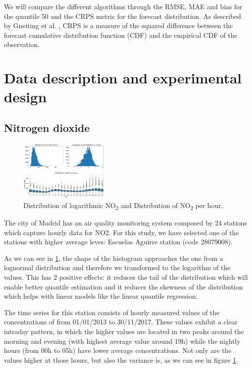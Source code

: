 \documentclass[a4paper,twocolumn,5p]{elsarticle}
\begin{document}
We will compare the different algorithms through the RMSE, MAE 
and bias for the quantile 50 and 
the CRPS metric for the forecast distribution.
As described by Gneiting et al. \cite{gneiting_probabilistic_2014},
CRPS is a measure of the squared difference between the 
forecast cumulative distribution function (CDF) 
and the empirical CDF of the observation.

\section{Data description and experimental design}

\subsection{Nitrogen dioxide}
\label{sec:no2}

\begin{figure}
  \centering
  \includegraphics[width=0.4\textwidth]{histo_variance}
  \caption{\label{figure:histo_variance}Distribution of logarithmic
    NO\textsubscript{2} and Distribution of NO\textsubscript{2}
    per hour.}
\end{figure}

The city of Madrid has an air quality monitoring system composed by 24
stations which capture hourly data for NO2.  For this study, we 
have selected one of
the stations with higher average leves: 
Escuelas Aguirre station (code
28079008).

As we can see in \ref{figure:histo_variance}, the shape of the histogram
approaches the one from a lognormal distribution and therefore we
transformed to the logarithm of the values. This has 2 positive
effects: it reduces the tail of the distribution which will enable
better quantile estimation and it reduces the skewness of the
distribution which helps with linear models like the linear quantile
regression.

The time series for this station consists of hourly measured values of
the concentrations of \no from 01/01/2013 to
30/11/2017. These values exhibit a clear intraday pattern, in which
the higher values are located in two peaks around the morning and
evening (with highest average value around 19h) while the nightly
hours (from 00h to 05h) have lower average concentrations.  Not only
are the values higher at those hours, but also the variance is, as we
can see in figure \ref{figure:histo_variance}.
 
\end{document}

